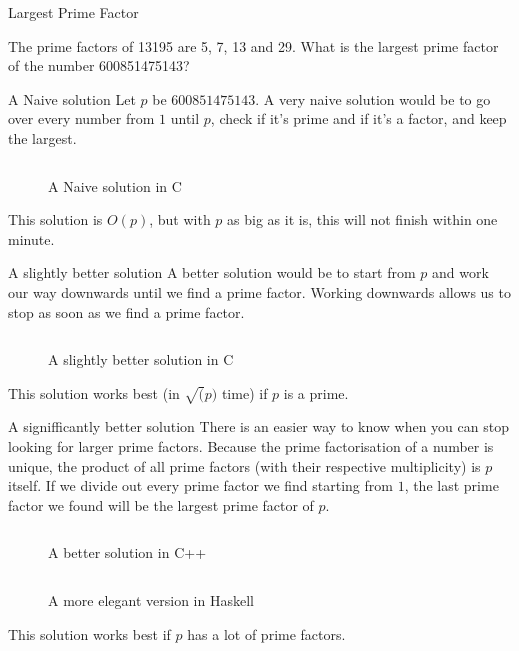 \documentclass[main.tex]{subfiles}
\begin{document}
\begin{prob}{3}{Largest Prime Factor}
  \begin{problem}
    The prime factors of 13195 are 5, 7, 13 and 29.
    What is the largest prime factor of the number 600851475143?
  \end{problem}

  \begin{solutions}
    \begin{solution}{A Naive solution}
      Let $p$ be $600851475143$.
      A very naive solution would be to go over every number from $1$ until $p$, check if it's prime and if it's a factor, and keep the largest.
      \begin{figure}[H]
        \inputminted[firstline=19, lastline=28]{c}{\sol{003}{c}/naive.c}
        \caption{A Naive solution in C}
      \end{figure}
      This solution is $O(p)$, but with $p$ as big as it is, this will not finish within one minute.
    \end{solution}

    \begin{solution}{A slightly better solution}
      A better solution would be to start from $p$ and work our way downwards until we find a prime factor.
      Working downwards allows us to stop as soon as we find a prime factor.
      \begin{figure}[H]
        \inputminted[firstline=19, lastline=27]{c}{\sol{003}{c}/better.c}
        \caption{A slightly better solution in C}
      \end{figure}
      This solution works best (in $\sqrt(p)$ time) if $p$ is a prime.
    \end{solution}

    \begin{solution}{A signifficantly better solution}
      There is an easier way to know when you can stop looking for larger prime factors.
      Because the prime factorisation of a number is unique, the product of all prime factors (with their respective multiplicity) is $p$ itself.
      If we divide out every prime factor we find starting from $1$, the last prime factor we found will be the largest prime factor of $p$.

      \begin{figure}[H]
        \inputminted[firstline=17, lastline=28]{c++}{\sol{003}{c++}/solution.cc}
        \caption{A better solution in C++}
      \end{figure}
      \begin{figure}[H]
        \inputminted[firstline=6, lastline=7]{haskell}{\sol{003}{haskell}/solution.hs}
        \caption{A more elegant version in Haskell}
      \end{figure}
      This solution works best if $p$ has a lot of prime factors.
    \end{solution}
  \end{solutions}
\end{prob}
\end{document}
